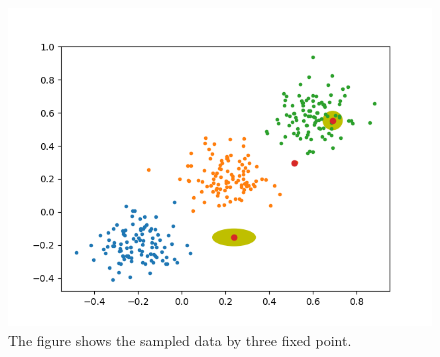 \documentclass[a4paper]{article}
\begin{document}
\begin{figure}[!htbp]
\begin{center}
\includegraphics[width=16cm]{imgs/100_learn.png}
\end{center}
\caption{The figure shows the sampled data by three fixed point.}\label{datavis}
\end{figure}
\end{document}
